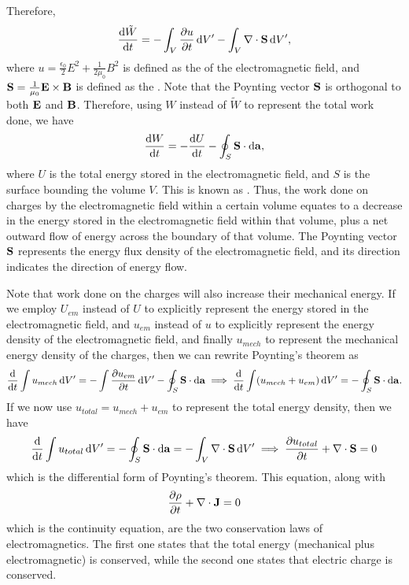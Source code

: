 Therefore,
\begin{align}
    \frac{\mathrm{d}\tilde{W}}{\mathrm{d}t} = -\int_{V} \frac{\partial u}{\partial t} \, \mathrm{d}V' - \int_{V} \nabla \cdot \mathbf{S} \, \mathrm{d}V',
\end{align}
where $u = \frac{\epsilon_{0}}{2} E^{2} + \frac{1}{2 \mu_{0}} B^{2}$ is defined as the  of the electromagnetic field, and $\mathbf{S} = \frac{1}{\mu_{0}} \mathbf{E} \times \mathbf{B}$ is defined as the . Note that the Poynting vector $\mathbf{S}$ is orthogonal to both $\mathbf{E}$ and $\mathbf{B}$. Therefore, using $W$ instead of $\tilde{W}$ to represent the total work done, we have
\begin{align}
    \frac{\mathrm{d}W}{\mathrm{d}t} = -\frac{\mathrm{d}U}{\mathrm{d}t} - \oint_{S} \mathbf{S} \cdot \mathrm{d}\mathbf{a},
\end{align}
where $U$ is the total energy stored in the electromagnetic field, and $S$ is the surface bounding the volume $V$. This is known as . Thus, the work done on charges by the electromagnetic field within a certain volume equates to a decrease in the energy stored in the electromagnetic field within that volume, plus a net outward flow of energy across the boundary of that volume. The Poynting vector $\mathbf{S}$ represents the energy flux density of the electromagnetic field, and its direction indicates the direction of energy flow.

Note that work done on the charges will also increase their mechanical energy. If we employ $U_{em}$ instead of $U$ to explicitly represent the energy stored in the electromagnetic field, and $u_{em}$ instead of $u$ to explicitly represent the energy density of the electromagnetic field, and finally $u_{mech}$ to represent the mechanical energy density of the charges, then we can rewrite Poynting's theorem as
\begin{align}
    \frac{\mathrm{d}}{\mathrm{d}t} \int u_{mech} \, \mathrm{d}V' = -\int \frac{\partial u_{em}}{\partial t} \, \mathrm{d}V' - \oint_{S} \mathbf{S} \cdot \mathrm{d}\mathbf{a} \implies \frac{\mathrm{d}}{\mathrm{d}t} \int (u_{mech} + u_{em}) \, \mathrm{d}V' = -\oint_{S} \mathbf{S} \cdot \mathrm{d}\mathbf{a}.
\end{align}
If we now use $u_{total} = u_{mech} + u_{em}$ to represent the total energy density, then we have
\begin{align}
    \frac{\mathrm{d}}{\mathrm{d}t} \int u_{total} \, \mathrm{d}V' = -\oint_{S} \mathbf{S} \cdot \mathrm{d}\mathbf{a} = -\int_{V} \nabla \cdot \mathbf{S} \, \mathrm{d}V' \implies \frac{\partial u_{total}}{\partial t} + \nabla \cdot \mathbf{S} = 0
\end{align}
which is the differential form of Poynting's theorem. This equation, along with
\begin{align}
    \frac{\partial \rho}{\partial t} + \nabla \cdot \mathbf{J} = 0
\end{align}
which is the continuity equation, are the two conservation laws of electromagnetics. The first one states that the total energy (mechanical plus electromagnetic) is conserved, while the second one states that electric charge is conserved.

